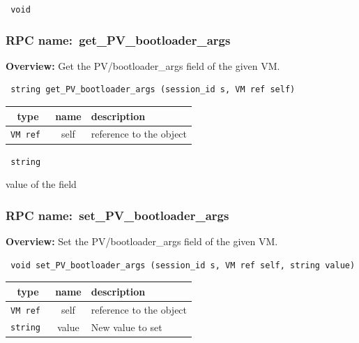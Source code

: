 \vspace{0.3cm}

{\tt 
void
}



\vspace{0.3cm}
\vspace{0.3cm}
\vspace{0.3cm}
\subsubsection{RPC name:~get\_PV\_bootloader\_args}

{\bf Overview:} 
Get the PV/bootloader\_args field of the given VM.

\begin{verbatim} string get_PV_bootloader_args (session_id s, VM ref self)\end{verbatim}



 
\vspace{0.3cm}
\begin{tabular}{|c|c|p{7cm}|}
 \hline
{\bf type} & {\bf name} & {\bf description} \\ \hline
{\tt VM ref } & self & reference to the object \\ \hline 

\end{tabular}

\vspace{0.3cm}

{\tt 
string
}


value of the field
\vspace{0.3cm}
\vspace{0.3cm}
\vspace{0.3cm}
\subsubsection{RPC name:~set\_PV\_bootloader\_args}

{\bf Overview:} 
Set the PV/bootloader\_args field of the given VM.

\begin{verbatim} void set_PV_bootloader_args (session_id s, VM ref self, string value)\end{verbatim}



 
\vspace{0.3cm}
\begin{tabular}{|c|c|p{7cm}|}
 \hline
{\bf type} & {\bf name} & {\bf description} \\ \hline
{\tt VM ref } & self & reference to the object \\ \hline 

{\tt string } & value & New value to set \\ \hline 

\end{tabular}

